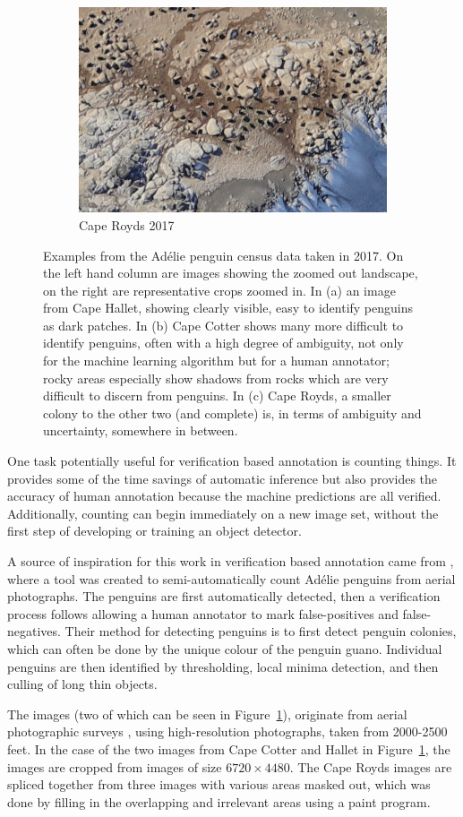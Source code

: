 \begin{figure}[pht!]
\begin{subfigure}[t]{1.0\linewidth}
  \hfill
  \includegraphics[width=0.475\linewidth]{figures/annotation/penguin/royds.jpg}
  \caption{Cape Royds 2017}
\end{subfigure}

\caption{Examples from the Ad\'elie penguin census data taken in 2017. On the left hand column are images showing the zoomed out landscape, on the right are representative crops zoomed in.  In (a) an image from Cape Hallet, showing clearly visible, easy to identify penguins as dark patches. In (b) Cape Cotter shows many more difficult to identify penguins, often with a high degree of ambiguity, not only for the machine learning algorithm but for a human annotator; rocky areas especially show shadows from rocks which are very difficult to discern from penguins. In (c) Cape Royds, a smaller colony to the other two (and complete) is, in terms of ambiguity and uncertainty, somewhere in between. }
\label {fig:penguin_examples}
\end{figure}


One task potentially useful for verification based annotation is counting things. It provides some of the time savings of automatic inference but also provides the accuracy of human annotation because the machine predictions are all verified. Additionally, counting can begin immediately on a new image set, without the first step of developing or training an object detector.

A source of inspiration for this work in verification based annotation came from \cite{McNeill2011}, where a tool was created to semi-automatically count Ad\'elie penguins from aerial photographs. The penguins are first automatically detected, then a verification process follows allowing a human annotator to mark false-positives and false-negatives. Their method for detecting penguins is to first detect penguin colonies, which can often be done by the unique colour of the penguin guano. Individual penguins are then identified by thresholding, local minima detection, and then culling of long thin objects. 

The images (two of which can be seen in Figure~\ref{fig:penguin_examples}), originate from aerial photographic surveys \cite{Lyver2014}, using high-resolution photographs, taken from 2000-2500 feet. In the case of the two images from Cape Cotter and Hallet in Figure~\ref{fig:penguin_examples}, the images are cropped from images of size $ 6720\times4480 $. The Cape Royds images are spliced together from three images with various areas masked out, which was done by filling in the overlapping and irrelevant areas using a paint program.

